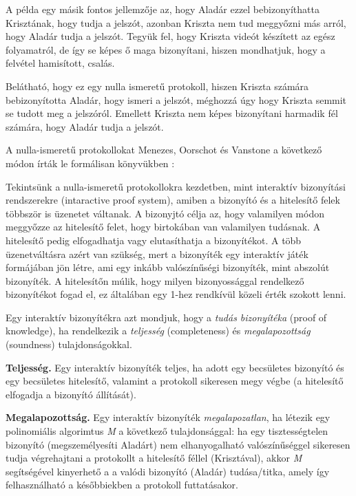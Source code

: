A példa egy másik fontos jellemzője az, hogy Aladár ezzel bebizonyíthatta Krisztának, hogy tudja a jelszót, azonban Kriszta nem tud meggyőzni más arról, hogy Aladár tudja a jelszót. Tegyük fel, hogy Kriszta videót készített az egész folyamatról, de így se képes ő maga bizonyítani, hiszen mondhatjuk, hogy a felvétel hamisított, csalás.

Belátható, hogy ez egy nulla ismeretű protokoll, hiszen Kriszta számára bebizonyította Aladár, hogy ismeri a jelszót, méghozzá úgy hogy Kriszta semmit se tudott meg a jelszóról. Emellett Kriszta nem képes bizonyítani harmadik fél számára, hogy Aladár tudja a jelszót.

A nulla-ismeretű protokollokat Menezes, Oorschot és Vanstone a következő módon írták le formálisan könyvükben \citeyear{menezes1997handbook}:

Tekintsünk a nulla-ismeretű protokollokra kezdetben, mint interaktív bizonyítási rendszerekre (intaractive proof system), amiben a bizonyító és a hitelesítő felek többször is üzenetet váltanak. A bizonyjtó célja az, hogy valamilyen módon meggyőzze az hitelesítő felet, hogy birtokában van valamilyen tudásnak. A hitelesítő pedig elfogadhatja vagy elutasíthatja a bizonyítékot. A több üzenetváltásra azért van szükség, mert a bizonyíték egy interaktív játék formájában jön létre, ami egy inkább valószínűségi bizonyíték, mint abszolút bizonyíték. A hitelesítőn múlik, hogy milyen bizonyossággal rendelkező bizonyítékot fogad el, ez általában egy 1-hez rendkívül közeli érték szokott lenni.

Egy interaktív bizonyítékra azt mondjuk, hogy a \textit{tudás bizonyítéka} (proof of knowledge), ha rendelkezik a \textit{teljesség} (completeness) és \textit{megalapozottság} (soundness) tulajdonságokkal.

\begin{definition}
    \textbf{Teljesség.} Egy interaktív bizonyíték teljes, ha adott egy becsületes bizonyító és egy becsületes hitelesítő, valamint a protokoll sikeresen megy végbe (a hitelesítő elfogadja a bizonyító állítását).
\end{definition}

\begin{definition}
    \textbf{Megalapozottság.} Egy interaktív bizonyíték \textit{megalapozatlan}, ha létezik egy polinomiális algorimtus \textit{M} a következő tulajdonsággal: ha egy tisztességtelen bizonyító (megszemélyesíti Aladárt) nem elhanyogalható valószínűséggel sikeresen tudja végrehajtani a protokollt a hitelesítő féllel (Krisztával), akkor \textit{M} segítségével kinyerhető a a valódi bizonyító (Aladár) tudása/titka, amely így felhasználható a későbbiekben a protokoll futtatásakor.
\end{definition}

